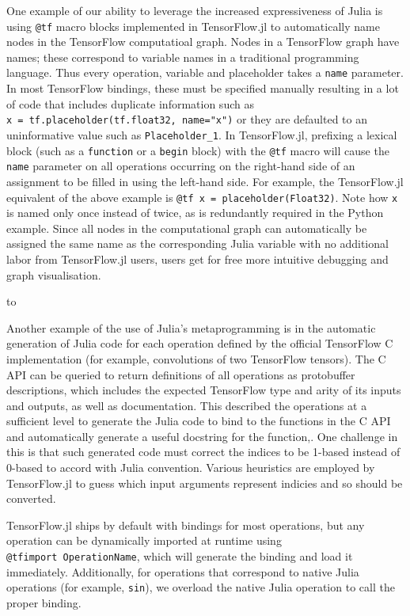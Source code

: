 \documentclass{book}
\begin{document}
One example of our ability to leverage the increased expressiveness of
Julia is using \texttt{@tf} macro blocks implemented in TensorFlow.jl to
automatically name nodes in the TensorFlow computatioal graph. Nodes in
a TensorFlow graph have names; these correspond to variable names in a
traditional programming language. Thus every operation, variable and
placeholder takes a \texttt{name} parameter. In most TensorFlow
bindings, these must be specified manually resulting in a lot of code
that includes duplicate information such as
\texttt{x\ =\ tf.placeholder(tf.float32,\ name="x")} or they are
defaulted to an uninformative value such as \texttt{Placeholder\_1}. In
TensorFlow.jl, prefixing a lexical block (such as a \texttt{function} or
a \texttt{begin} block) with the \texttt{@tf} macro will cause the
\texttt{name} parameter on all operations occurring on the right-hand
side of an assignment to be filled in using the left-hand side. For
example, the TensorFlow.jl equivalent of the above example is
\texttt{@tf\ x\ =\ placeholder(Float32)}. Note how \texttt{x} is named
only once instead of twice, as is redundantly required in the Python
example. Since all nodes in the computational graph can automatically be
assigned the same name as the corresponding Julia variable with no
additional labor from TensorFlow.jl users, users get for free more
intuitive debugging and graph visualisation.


to

Another example of the use of Julia's metaprogramming is in the
automatic generation of Julia code for each operation defined by the
official TensorFlow C implementation (for example, convolutions of two
TensorFlow tensors). The C API can be queried to return definitions of
all operations as protobuffer descriptions, which includes the expected
TensorFlow type and arity of its inputs and outputs, as well as
documentation. This described the operations at a sufficient level to
generate the Julia code to bind to the functions in the C API and
automatically generate a useful docstring for the function,. One
challenge in this is that such generated code must correct the indices
to be 1-based instead of 0-based to accord with Julia convention.
Various heuristics are employed by TensorFlow.jl to guess which input
arguments represent indicies and so should be converted.

TensorFlow.jl ships by default with bindings for most operations, but
any operation can be dynamically imported at runtime using
\texttt{@tfimport\ OperationName}, which will generate the binding and
load it immediately. Additionally, for operations that correspond to
native Julia operations (for example, \texttt{sin}), we overload the
native Julia operation to call the proper binding.
\end{document}
